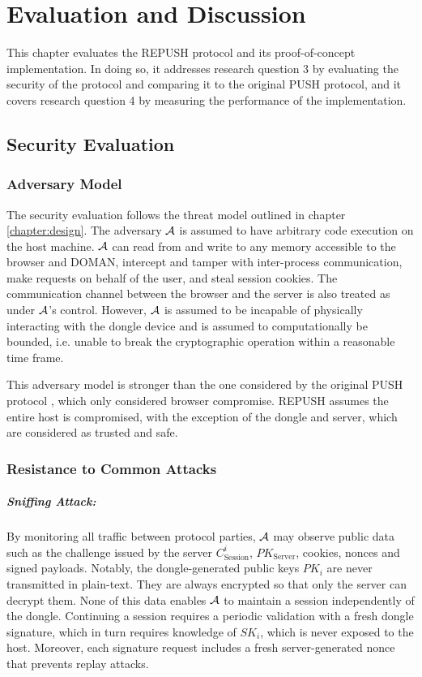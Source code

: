 
\chapter{Evaluation and Discussion}
\label{chapter:evaluation}
This chapter evaluates the REPUSH protocol and its proof-of-concept implementation. In doing so, it addresses research question 3 by evaluating the security of the protocol and comparing it to the original PUSH protocol, and it covers research question 4 by measuring the performance of the implementation. 

\section{Security Evaluation}
\subsection{Adversary Model}
The security evaluation follows the threat model outlined in chapter \ref{chapter:design}. The adversary $\mathcal{A}$ is assumed to have arbitrary code execution on the host machine. $\mathcal{A}$ can read from and write to any memory accessible to the browser and DOMAN, intercept and tamper with inter-process communication, make requests on behalf of the user, and steal session cookies. The communication channel between the browser and the server is also treated as under $\mathcal{A}$'s control. However, $\mathcal{A}$ is assumed to be incapable of physically interacting with the dongle device and is assumed to computationally be bounded, i.e. unable to break the cryptographic operation within a reasonable time frame.   

This adversary model is stronger than the one considered by the original PUSH protocol \cite{10.1007/978-3-032-07894-0_7}, which only considered browser compromise. REPUSH assumes the entire host is compromised, with the exception of the dongle and server, which are considered as trusted and safe.

\subsection{Resistance to Common Attacks}

\paragraph{Sniffing Attack:}
By monitoring all traffic between protocol parties, $\mathcal{A}$ may observe public data such as the challenge issued by the server $C^i_\text{Session}$, $PK_\text{Server}$, cookies, nonces and signed payloads. Notably, the dongle-generated public keys $PK_i$ are never transmitted in plain-text. They are always encrypted so that only the server can decrypt them. None of this data enables $\mathcal{A}$ to maintain a session independently of the dongle. Continuing a session requires a periodic validation with a fresh dongle signature, which in turn requires knowledge of $SK_i$, which is never exposed to the host. Moreover, each signature request includes a fresh server-generated nonce that prevents replay attacks.


